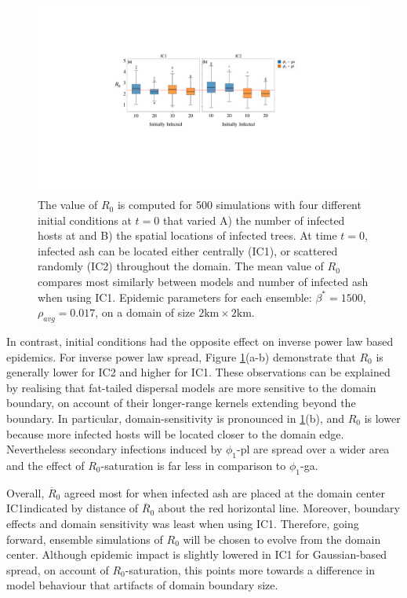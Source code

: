 \begin{figure}
    \centering
    \includegraphics[scale=0.45]{chapter6/figures/fig5-IC.pdf}
    \caption{The value of $R_0$ is computed for 500 simulations with four different initial conditions at $t=0$ that varied A) the number of infected hosts at and B) the spatial locations of infected trees. 
    At time $t=0$, infected ash can be located either centrally (IC1), or scattered randomly (IC2) throughout the domain.
    The mean value of $R_0$ compares most similarly between models and number of infected ash when using IC1.
    Epidemic parameters for each ensemble: $\beta^*=1500$, $\rho_{avg}=0.017$, on a domain of size $\mathrm{2km\times 2km}$.}
    \label{fig:seir-ash-IC}
\end{figure}

In contrast, initial conditions had the opposite effect on inverse power law based epidemics.
For inverse power law spread, Figure \ref{fig:seir-ash-IC}(a-b) demonstrate that $R_0$ is generally lower for IC2 and higher for IC1.
These observations can be explained by realising that fat-tailed dispersal models are more sensitive to the domain boundary, on account of their longer-range kernels extending beyond the boundary.
In particular, domain-sensitivity is pronounced in \ref{fig:seir-ash-IC}(b), and $R_0$ is lower because more infected hosts will be located closer to the domain edge.
Nevertheless secondary infections induced by $\phi_1$-pl are spread over a wider area and the effect of $R_0$-saturation is far less in comparison to $\phi_1$-ga.

Overall, $\overline{R}_0$ agreed most for when infected ash are placed at the domain center IC1\textemdash indicated by distance of $\overline{R}_0$ about the red horizontal line.
Moreover, boundary effects and domain sensitivity was least when using IC1.
Therefore, going forward, ensemble simulations of $R_0$ will be chosen to evolve from the domain center.
Although epidemic impact is slightly lowered in IC1 for Gaussian-based spread, on account of $R_0$-saturation, 
this points more towards a difference in model behaviour that artifacts of domain boundary size.


